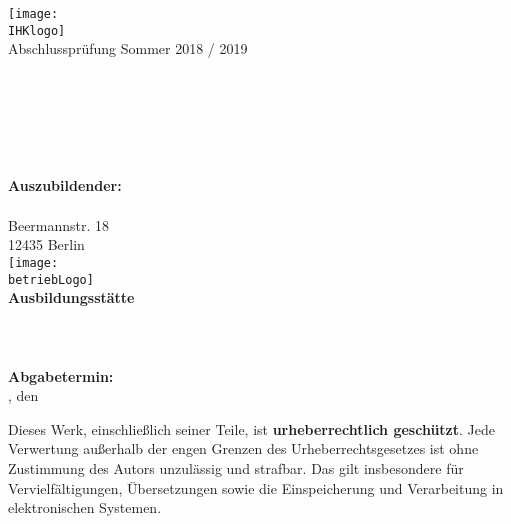 \begin{titlepage}

\begin{center}
\texttt{[image: \\IHKlogo]}\\[1ex]
Abschlussprüfung Sommer 2018 / 2019\\[1ex]
\Large{\ausbildungsberuf}\\
\LARGE{\betreff}\\[1.5ex]
\huge{\textbf{\titelOne\\\titelTwo}}\\
\Large{\textbf{\untertitelOne}}\\
\Large{\textbf{\untertitelTwo}}\\[4ex]

\normalsize
\textbf{Auszubildender:}\\
\autorName\\
Beermannstr. 18\\
12435 Berlin\\[7ex]

\texttt{[image: \\betriebLogo]}\\[1.5ex]
\textbf{Ausbildungsstätte}\\
\betriebName{}\\
\betriebAnschrift{}\\
\betriebOrt\\[9ex]

\textbf{Abgabetermin:}\\
\abgabeOrt{}, den \abgabeTermin\\[10ex]

\end{center}

\small
\noindent
Dieses Werk, einschließlich seiner Teile, ist \textbf{urheberrechtlich geschützt}.
Jede Verwertung außerhalb der engen Grenzen des Urheberrechtsgesetzes ist ohne Zustimmung des Autors unzulässig und strafbar.
Das gilt insbesondere für Vervielfältigungen, Übersetzungen sowie die Einspeicherung und Verarbeitung in elektronischen Systemen.

\end{titlepage}
